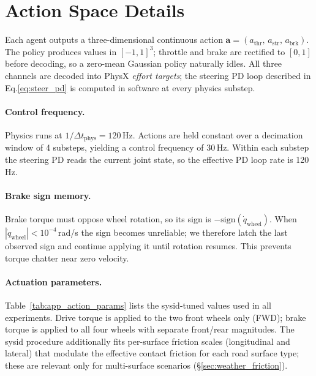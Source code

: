 \section{Action Space Details}
\label{app:actions}

Each agent outputs a three-dimensional continuous action $\mathbf{a} = (a_{\mathrm{thr}},\, a_{\mathrm{str}},\, a_{\mathrm{brk}})$.
The policy produces values in $[-1,1]^3$; throttle and brake are rectified to $[0,1]$ before decoding, so a zero-mean Gaussian policy naturally idles.
All three channels are decoded into PhysX \emph{effort targets}; the steering PD loop described in Eq.\ref{eq:steer_pd} is computed in software at every physics substep.

\paragraph{Control frequency.}
Physics runs at $1/\Delta t_{\mathrm{phys}} = 120$\,Hz.
Actions are held constant over a decimation window of 4 substeps, yielding a control frequency of 30\,Hz.
Within each substep the steering PD reads the current joint state, so the effective PD loop rate is 120\,Hz.

\paragraph{Brake sign memory.}
Brake torque must oppose wheel rotation, so its sign is $-\mathrm{sign}(\dot{q}_{\mathrm{wheel}})$.
When $|\dot{q}_{\mathrm{wheel}}| < 10^{-4}$\,rad/s the sign becomes unreliable; we therefore latch the last observed sign and continue applying it until rotation resumes.
This prevents torque chatter near zero velocity.

\paragraph{Actuation parameters.}
Table~\ref{tab:app_action_params} lists the sysid-tuned values used in all experiments.
Drive torque is applied to the two front wheels only (FWD); brake torque is applied to all four wheels with separate front/rear magnitudes.
The sysid procedure additionally fits per-surface friction scales (longitudinal and lateral) that modulate the effective contact friction for each road surface type; these are relevant only for multi-surface scenarios (\S\ref{sec:weather_friction}).

